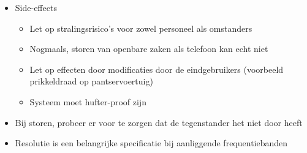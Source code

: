 \documentclass[12pt, a4paper]{article}
\begin{document}
\begin{itemize}
    \item Side-effects
    \begin{itemize}
        \item Let op stralingsrisico's voor zowel personeel als omstanders
        \item Nogmaals, storen van openbare zaken als telefoon kan echt niet
        \item Let op effecten door modificaties door de eindgebruikers (voorbeeld prikkeldraad op pantservoertuig)
        \item Systeem moet hufter-proof zijn
    \end{itemize}

    \item Bij storen, probeer er voor te zorgen dat de tegenstander het niet door heeft
    \item Resolutie is een belangrijke specificatie bij aanliggende frequentiebanden
\end{itemize}
\end{document}
